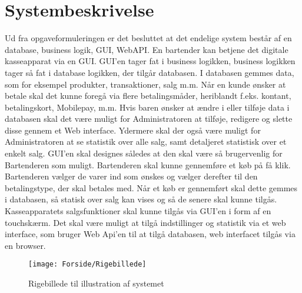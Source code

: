 \chapter{Systembeskrivelse}
Ud fra opgaveformuleringen er det besluttet at det endelige system består af en database, business logik, \gls{GUI}, \gls{WebAPI}. 
\newline
\newline
En bartender kan betjene det digitale kasseapparat via en \gls{GUI}. \gls{GUI}'en tager fat i business logikken, business logikken tager så fat i database logikken, der tilgår databasen. I databasen gemmes data, som for eksempel produkter, transaktioner, salg m.m.
Når en kunde ønsker at betale skal det kunne foregå via flere betalingsmåder, heriblandt f.eks. kontant, betalingskort, Mobilepay, m.m.
\newline
\newline
Hvis baren ønsker at ændre i eller tilføje data i databasen skal det være muligt for Administratoren at tilføje, redigere og slette disse gennem et Web interface. Ydermere skal der også være muligt for Administratoren at se statistik over alle salg, samt detaljeret statistisk over et enkelt salg. 
\newline
\newline
GUI'en skal designes således at den skal være så brugervenlig for Bartenderen som muligt. Bartenderen skal kunne gennemføre et køb på få klik. Bartenderen vælger de varer ind som ønskes og vælger derefter til den betalingstype, der skal betales med. Når et køb er gennemført skal dette gemmes i databasen, så statisk over salg kan vises og så de senere skal kunne tilgås. 
\newline
\newline
Kasseapparatets salgsfunktioner skal kunne tilgås via \gls{GUI}'en i form af en touchskærm. Det skal være muligt at tilgå indstillinger og statistik via et web interface, som bruger Web Api'en til at tilgå databasen, web interfacet tilgås via en browser. 
                  
\begin{figure}[h]
    \centering
    \texttt{[image: Forside/Rigebillede]}
    \caption{Rigebillede til illustration af systemet}
    \label{fig:rig_billede}
\end{figure} 

